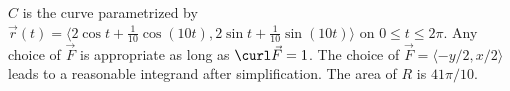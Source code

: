 {$C$ is the curve parametrized by $\vec r(t) = \langle 2\cos t+\frac1{10}\cos(10t),2\sin t+\frac1{10}\sin (10t)\rangle$ on $0\leq t\leq 2\pi$. 
}
{Any choice of $\vec F$ is appropriate as long as $\curl \vec F = 1$. The choice of  $\vec F = \langle -y/2,x/2\rangle$ leads to a reasonable integrand after simplification. The area of $R$ is $41\pi/10$.
}
